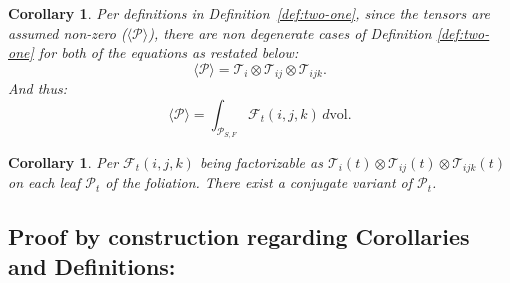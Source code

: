 \documentclass[10pt]{article}
\theoremstyle{plain}
\newtheorem{corollary}[theorem]{Corollary}
\theoremstyle{definition}
\theoremstyle{remark}
\begin{document}
\begin{corollary}
\label{cor:tensor-nz}
  Per definitions in Definition~\ref{def:two-one}, since the tensors are assumed non-zero ($\langle \mathcal{P} \rangle$), there are non degenerate cases of Definition \ref{def:two-one} for both of the equations as restated below:
  \begin{equation}
    \langle \mathcal{P} \rangle = \mathcal{T}_i \otimes \mathcal{T}_{ij} \otimes \mathcal{T}_{ijk}.
  \end{equation}
  And thus:
  \begin{equation}
    \langle \mathcal{P} \rangle = \int_{\mathcal{P}_{S,F}} \mathcal{F}_{t}(i, j, k) \, d\mathrm{vol}.
  \end{equation}
\end{corollary}

\begin{corollary}
\label{cor:three}
  Per $\mathcal{F}_t(i, j, k)$ being factorizable as $\mathcal{T}_i(t) \otimes \mathcal{T}_{ij}(t) \otimes \mathcal{T}_{ijk}(t)$ on each leaf $\mathcal{P}_t$ of the foliation. There exist a conjugate variant of $\mathcal{P}_t$.
\end{corollary}

\subsection{Proof by construction regarding Corollaries and Definitions:}
\end{document}
